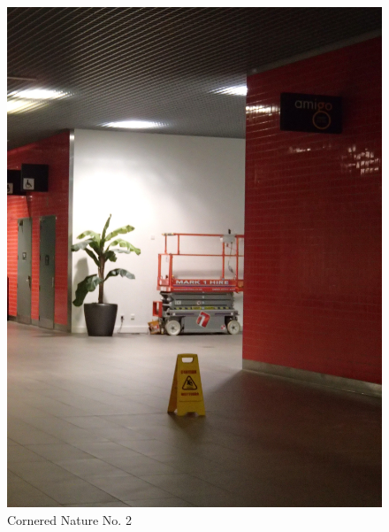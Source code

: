 \documentclass{article}
\begin{document}
\begin{figure}
\centering
\includegraphics[width=\textwidth,angle=-90]{figures/P1050158.JPG}
\caption{Cornered Nature No. 2}
\end{figure}
\end{document}
